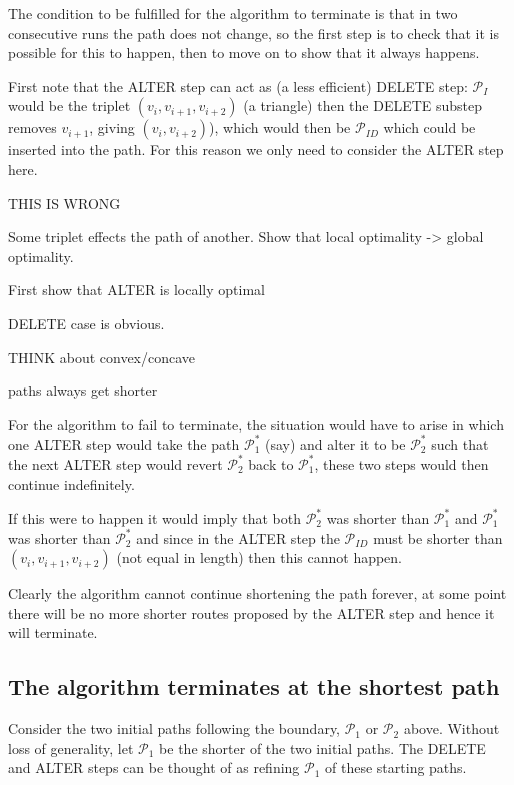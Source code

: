 The condition to be fulfilled for the algorithm to terminate is that in two consecutive runs the path does not change, so the first step is to check that it is possible for this to happen, then to move on to show that it always happens. 

First note that the ALTER step can act as (a less efficient) DELETE step: $\mathcal{P}_{I}$ would be the triplet $(v_i,v_{i+1},v_{i+2})$ (a triangle) then the DELETE substep removes $v_{i+1}$, giving $(v_i,v_{i+2})$), which would then be $\mathcal{P}_{ID}$ which could be inserted into the path. For this reason we only need to consider the ALTER step here.


THIS IS WRONG

Some triplet effects the path of another. Show that local optimality -> global optimality.

First show that ALTER is locally optimal

DELETE case is obvious.

THINK about convex/concave

paths always get shorter


For the algorithm to fail to terminate, the situation would have to arise in which one ALTER step would take the path $\mathcal{P}_1^*$ (say) and alter it to be $\mathcal{P}_2^*$ such that the next ALTER step would revert $\mathcal{P}_2^*$ back to $\mathcal{P}_1^*$, these two steps would then continue indefinitely.

If this were to happen it would imply that both $\mathcal{P}_2^*$ was shorter than $\mathcal{P}_1^*$ and $\mathcal{P}_1^*$ was shorter than $\mathcal{P}_2^*$ and since in the ALTER step the $\mathcal{P}_{ID}$ must be shorter than $(v_i,v_{i+1},v_{i+2})$ (not equal in length) then this cannot happen.

Clearly the algorithm cannot continue shortening the path forever, at some point there will be no more shorter routes proposed by the ALTER step and hence it will terminate.


\subsection{The algorithm terminates at the shortest path}

Consider the two initial paths following the boundary, $\mathcal{P}_1$ or $\mathcal{P}_2$ above. Without loss of generality, let $\mathcal{P}_1$ be the shorter of the two initial paths. The DELETE and ALTER steps can be thought of as refining $\mathcal{P}_1$ of these starting paths.

